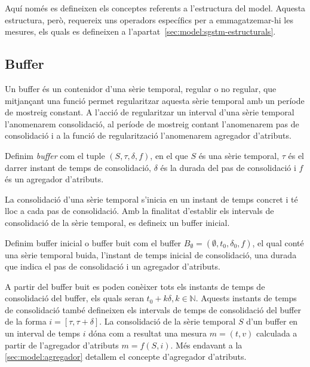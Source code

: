 Aquí només es defineixen els conceptes referents a l'estructura del
model. Aquesta estructura, però, requereix uns operadors específics
per a emmagatzemar-hi les mesures, els quals es defineixen a
l'apartat~\ref{sec:model:sgstm-estructurals}.




\subsection{Buffer}\label{sec:model:buffer}

Un buffer és un contenidor d'una sèrie temporal, regular o no regular, que mitjançant una funció permet regularitzar aquesta sèrie temporal amb un període de mostreig constant. A l'acció de regularitzar un interval d'una sèrie temporal l'anomenarem consolidació, al període de mostreig contant l'anomenarem pas de consolidació i a la funció de regularització l'anomenarem agregador d'atributs.

\begin{definition}[Buffer]
  Definim \emph{buffer} com el tuple $(S,\tau,\delta,f)$, en el que
  $S$ és una sèrie temporal, $\tau$ és el darrer instant de temps de
  consolidació, $\delta$ és la durada del pas de consolidació i $f$ és
  un agregador d'atributs.
\end{definition}

La consolidació d'una sèrie temporal s'inicia en un instant de temps
concret i té lloc a cada pas de consolidació. Amb la finalitat
d'establir els intervals de consolidació de la sèrie temporal, es
defineix un buffer inicial.

\begin{definition}\label{def:model:buffer_buit}
  Definim buffer inicial o buffer buit com el buffer $B_{\emptyset} =
  (\emptyset,t_0, \delta_0, f)$, el qual
  conté una sèrie temporal buida, l'instant de temps inicial de
  consolidació, una durada que indica el pas de consolidació i un
  agregador d'atributs.
\end{definition}

A partir del buffer buit es poden conèixer tots els instants de temps
de consolidació del buffer, els quals seran $t_0+k\delta,
k\in\mathbb{N}$. Aquests instants de temps de consolidació també
defineixen els intervals de temps de consolidació del buffer de la
forma $i=[\tau,\tau+\delta]$. La consolidació de la sèrie temporal $S$
d'un buffer en un interval de temps $i$ dóna com a resultat una mesura
$m=(t,v)$ calculada a partir de l'agregador d'atributs $m = f (S,
i)$. Més endavant a la \autoref{sec:model:agregador} detallem el
concepte d'agregador d'atributs.








